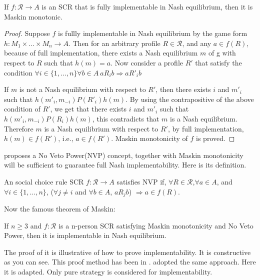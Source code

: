 \begin{thm}
If $f: \mathscr{R} \rightarrow A$ is an SCR that is fully implementable in
Nash equilibrium, then it is Maskin monotonic.
\end{thm}
\begin{proof}
Suppose $f$ is fullly implementable in Nash equilibrium by the game form $h:
M_1\times \dots \times M_n \rightarrow A$.  Then for an arbitrary
profile $R \in \mathscr{R}$, and any $a \in f(R)$, because of full
implementation, there exists a Nash equilibrium $m$ of g with respect
to $R$ such that $h(m) = a$. Now consider a profile $R'$ that satisfy
the condition $\forall i \in \{1, \dots, n\} \forall b \in A  \  aR_i b \Rightarrow
aR'_i b$

If $m$ is not a Nash equilibrium with respect to $R'$,  then there
exists $i$ and $m'_i$ such that $h(m'_i, m_{-i}) P(R'_i) h(m) $. By
using the contrapositive of the above condition of $R'$, we get that there
exists $i$ and $m'_i$ such that $h(m'_i, m_{-i}) P(R_i) h(m) $, this
contradicts that $m$ is a Nash equilibrium. 
Therefore $m$ is a Nash equilibrium with respect to $R'$, by full
implementation, $h(m) \in f(R')$, i.e., $a \in f(R')$. Maskin
monotonicity of $f$ is proved.


\end{proof}

\parencite{Maskin1999} proposes a No Veto Power(NVP) concept, together with
Maskin monotonicity will be sufficient to guarantee full Nash
implementability. Here is its definition.

\begin{definition}
An social choice rule SCR $f:\mathscr{R} \rightarrow A$ satisfies NVP
if,
$\forall R \in \mathscr{R}$,$\forall a \in A$, and $\forall i \in
\{1,\dots, n\}$, 
($\forall j \not = i$ and $\forall b \in A$, $a R_j
b$) $\Rightarrow a \in f(R)$.
\end{definition}

Now the famous theorem of Maskin:
\begin{thm}
If $n\geq 3$ and $f: \mathscr{R}$ is a  n-person SCR satisfying Maskin
monotonicity and No Veto Power,  then it is implementable in Nash equilibrium.
\end{thm}

The proof of it is illustrative of how to prove implementability. It
is constructive as you can see. This proof method has been
in \parencite{Repullo90}.  \parencite{Maskin1999} adopted the same
approach. Here it is adapted. Only pure strategy is considered for implementability.

